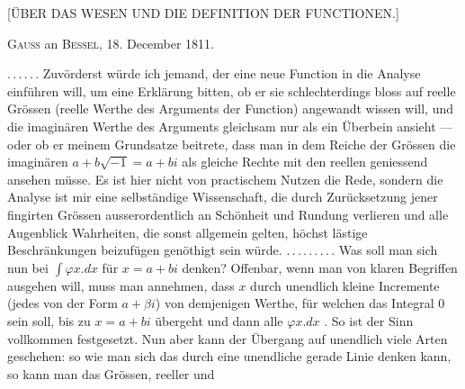 \clearpage
{}%

\begin{center}
\large [\"UBER DAS WESEN UND DIE DEFINITION DER FUNCTIONEN.]
\end{center}

\begin{center}
\textsc{Gauss} an \textsc{Bessel}, 18. December 1811.
\end{center}

\noindent\hspace*{\parindent}$\mathord{.}\,\mathord{.}\,\mathord{.}\,\mathord{.}\,\mathord{.}\,\mathord{.}$ Zuv\"orderst w\"urde ich jemand, der eine neue Function in die Analyse einf\"uhren will, um eine Erkl\"arung bitten, ob er sie schlechterdings bloss auf reelle Gr\"ossen (reelle Werthe des Arguments der Function) angewandt wissen will, und die imagin\"aren Werthe des Arguments gleichsam nur als ein \"Uberbein ansieht --- oder ob er meinem Grundsatze beitrete, dass man in dem Reiche der Gr\"ossen die imagin\"aren $a+b\sqrt{-1}=a+bi$ als gleiche Rechte mit den reellen geniessend ansehen m\"usse. Es ist hier nicht von practischem Nutzen die Rede, sondern die Analyse ist mir eine selbst\"andige Wissenschaft, die durch Zur\"ucksetzung jener fingirten Gr\"ossen ausserordentlich an Sch\"onheit und Rundung verlieren und alle Augenblick Wahrheiten, die sonst allgemein gelten, h\"ochst l\"astige Beschr\"ankungen beizuf\"ugen gen\"othigt sein w\"urde. $\mathord{.}\,\mathord{.}\,\mathord{.}\,\mathord{.}\,\mathord{.}\,\mathord{.}\,\mathord{.}\,\mathord{.}\,\mathord{.}$ Was soll man sich nun bei $\int \varphi x\mathord{.} dx$ f\"ur $x=a+bi$ denken? Offenbar, wenn man von klaren Begriffen ausgehen will, muss man annehmen, dass $x$ durch unendlich kleine Incremente (jedes von der Form $a+\beta i$) von demjenigen Werthe, f\"ur welchen das Integral 0 sein soll, bis zu $x=a+bi$ \"ubergeht und dann alle $\varphi x\mathord{.} dx$ . So ist der Sinn vollkommen festgesetzt. Nun aber kann der \"Ubergang auf unendlich viele Arten geschehen: so wie man sich das  durch eine unendliche gerade Linie denken kann, so kann man das  Gr\"ossen, reeller und
